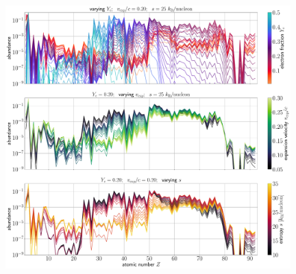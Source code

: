 \documentclass[twocolumn, twocolappendix]{aastex63}
\begin{document}
\begin{figure} [!ht]
    \includegraphics[width=0.98\textwidth]{figs/Ye_v_s_paper.pdf}

\end{figure}
\end{document}
